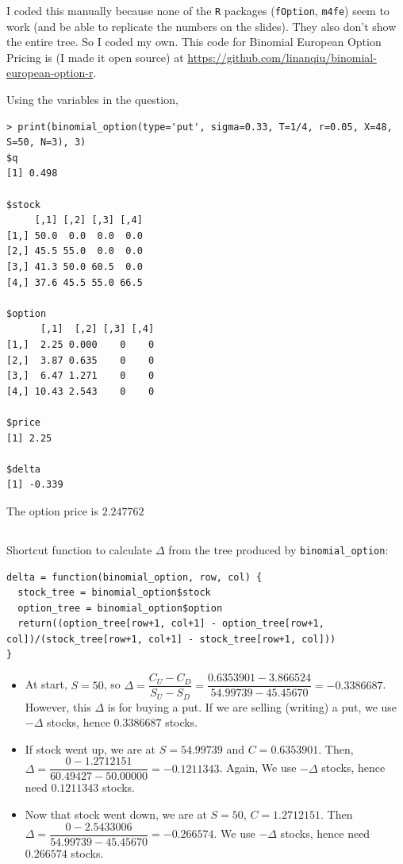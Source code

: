\documentclass[11pt]{scrartcl}
\begin{document}
I coded this manually because none of the \texttt{R} packages (\texttt{fOption}, \texttt{m4fe}) seem to work (and be able to replicate the numbers on the slides). They also don't show the entire tree. So I coded my own. This code for Binomial European Option Pricing is (I made it open source) at \url{https://github.com/linanqiu/binomial-european-option-r}.

Using the variables in the question,

\begin{lstlisting}
> print(binomial_option(type='put', sigma=0.33, T=1/4, r=0.05, X=48, S=50, N=3), 3)
$q
[1] 0.498

$stock
     [,1] [,2] [,3] [,4]
[1,] 50.0  0.0  0.0  0.0
[2,] 45.5 55.0  0.0  0.0
[3,] 41.3 50.0 60.5  0.0
[4,] 37.6 45.5 55.0 66.5

$option
      [,1]  [,2] [,3] [,4]
[1,]  2.25 0.000    0    0
[2,]  3.87 0.635    0    0
[3,]  6.47 1.271    0    0
[4,] 10.43 2.543    0    0

$price
[1] 2.25

$delta
[1] -0.339
\end{lstlisting}

The option price is $2.247762$

\subsection{}

Shortcut function to calculate $\Delta$ from the tree produced by \texttt{binomial\_option}:

\begin{lstlisting}
delta = function(binomial_option, row, col) {
  stock_tree = binomial_option$stock
  option_tree = binomial_option$option
  return((option_tree[row+1, col+1] - option_tree[row+1, col])/(stock_tree[row+1, col+1] - stock_tree[row+1, col]))
}
\end{lstlisting}

\begin{itemize}
\item At start, $S=50$, so $\Delta = \dfrac{C_U-C_D}{S_U-S_D} = \dfrac{0.6353901 - 3.866524}{54.99739-45.45670} = -0.3386687$. However, this $\Delta$ is for buying a put. If we are selling (writing) a put, we use $-\Delta$ stocks, hence $0.3386687$ stocks.
\item If stock went up, we are at $S=54.99739$ and $C = 0.6353901$. Then, $\Delta = \dfrac{0 - 1.2712151}{60.49427 - 50.00000} = -0.1211343$. Again, We use $-\Delta$ stocks, hence need $0.1211343$ stocks.
\item Now that stock went down, we are at $S=50$, $C=1.2712151$. Then $\Delta = \dfrac{0 - 2.5433006}{54.99739 - 45.45670} = -0.266574$. We use $-\Delta$ stocks, hence need $0.266574$ stocks.
\end{itemize}
\end{document}
